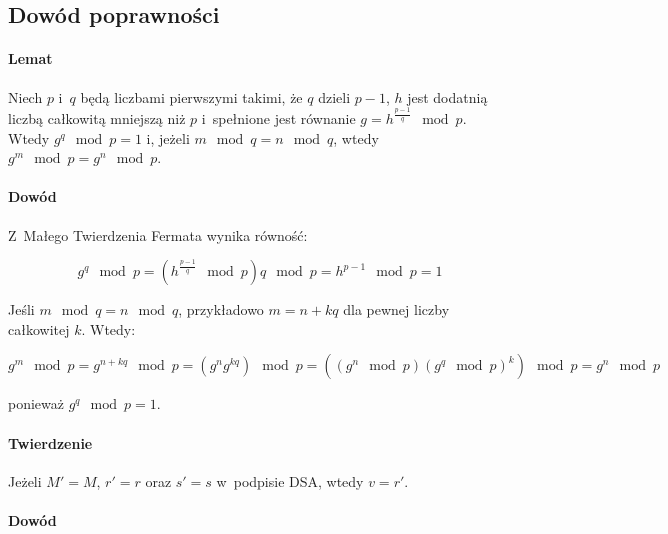 \documentclass{article}
\begin{document}
    \subsection*{Dowód poprawności}
    
        \paragraph{Lemat} 
            
            Niech $p$ i~$q$ będą liczbami pierwszymi takimi, że $q$ dzieli $p - 1$, $h$ jest dodatnią liczbą całkowitą mniejszą niż $p$ i~spełnione jest równanie $g = h^{\frac{p-1}{q}} \mod p$. Wtedy $g^{q} \mod p = 1$ i, jeżeli $m \mod q = n \mod q$, wtedy $g^{m} \mod p = g^{n} \mod p$.
            
        \paragraph{Dowód} 
        
            Z~Małego Twierdzenia Fermata wynika równość: 
            
            \begin{equation*}
                g^{q} \mod p = (h^{\frac{p - 1}{q}} \mod p) q \mod p = h^{p-1} \mod p = 1                            
            \end{equation*}

            Jeśli $m \mod q = n \mod q$, przykładowo $m = n + kq$ dla pewnej liczby całkowitej $k$. Wtedy:

            \begin{equation*}
                g^{m} \mod p = g^{n+kq} \mod p = (g^{n}g^{kq}) \mod p = ((g^{n} \mod p)(g^{q} \mod p)^{k}) \mod p = g^{n} \mod p
            \end{equation*}

            \noindent ponieważ $g^{q} \mod p = 1$.
            
        \paragraph{Twierdzenie}
        
            Jeżeli $M' = M$, $r' = r$ oraz $s' = s$ w~podpisie DSA, wtedy $v = r'$.
            
        \paragraph{Dowód}
        
\end{document}
